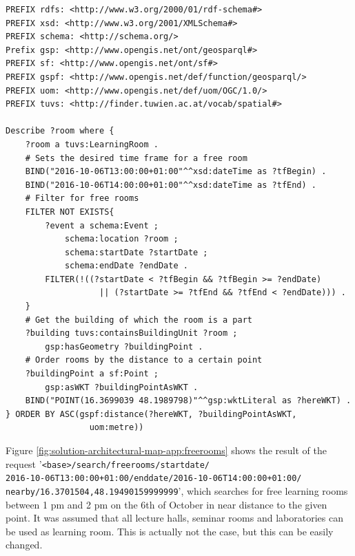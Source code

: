 \documentclass[draft,final]{vutinfth} %
\begin{document}
\begin{lstlisting}[frame=single, basicstyle=\small, caption=\gls{sparql} query for all free rooms nearby.
, label={lst:map-application-free-room-service}]
PREFIX rdfs: <http://www.w3.org/2000/01/rdf-schema#>
PREFIX xsd: <http://www.w3.org/2001/XMLSchema#>
PREFIX schema: <http://schema.org/>
Prefix gsp: <http://www.opengis.net/ont/geosparql#>
PREFIX sf: <http://www.opengis.net/ont/sf#>
PREFIX gspf: <http://www.opengis.net/def/function/geosparql/>
PREFIX uom: <http://www.opengis.net/def/uom/OGC/1.0/>
PREFIX tuvs: <http://finder.tuwien.ac.at/vocab/spatial#>

Describe ?room where {
    ?room a tuvs:LearningRoom .
    # Sets the desired time frame for a free room
    BIND("2016-10-06T13:00:00+01:00"^^xsd:dateTime as ?tfBegin) .
    BIND("2016-10-06T14:00:00+01:00"^^xsd:dateTime as ?tfEnd) .
    # Filter for free rooms
    FILTER NOT EXISTS{
        ?event a schema:Event ;
            schema:location ?room ;
            schema:startDate ?startDate ;
            schema:endDate ?endDate .
        FILTER(!((?startDate < ?tfBegin && ?tfBegin >= ?endDate)
                   || (?startDate >= ?tfEnd && ?tfEnd < ?endDate))) .
    }
    # Get the building of which the room is a part 
    ?building tuvs:containsBuildingUnit ?room ;
        gsp:hasGeometry ?buildingPoint .
    # Order rooms by the distance to a certain point
    ?buildingPoint a sf:Point ;
        gsp:asWKT ?buildingPointAsWKT .
    BIND("POINT(16.3699039 48.1989798)"^^gsp:wktLiteral as ?hereWKT) .
} ORDER BY ASC(gspf:distance(?hereWKT, ?buildingPointAsWKT,
                 uom:metre))
\end{lstlisting}

Figure \ref{fig:solution-architectural-map-app:freerooms} shows the result of the request '\texttt{<base>/search/freerooms/startdate/\\2016-10-06T13:00:00+01:00/enddate/2016-10-06T14:00:00+01:00/\\nearby/16.3701504,48.19490159999999}', which searches for free learning rooms between 1 pm and 2 pm on the 6th of October in near distance to the given point. It was assumed that all lecture halls, seminar rooms and laboratories can be used as learning room. This is actually not the case, but this can be easily changed.
\end{document}
